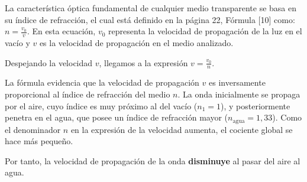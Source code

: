 \documentclass[11pt, a4paper]{article}
\newenvironment{problem}[1][Cuestión]{
	\vspace{0.5cm}
	\noindent{\Large\bfseries #1} \par\vspace{0.5cm}
}{
	\vspace{0.5cm}
}
\begin{document}
\begin{problem}[Cuestión 1]
\begin{enumerate}[label=\alph*)]
			{ \color{blue} 
				La característica óptica fundamental de cualquier medio transparente se basa en su índice de refracción, el cual está definido en la página 22, Fórmula [10] como: $n = \frac{v_0}{v}$. En esta ecuación, $v_0$ representa la velocidad de propagación de la luz en el vacío y $v$ es la velocidad de propagación en el medio analizado.

				Despejando la velocidad $v$, llegamos a la expresión $v = \frac{v_0}{n}$. 

				La fórmula evidencia que la velocidad de propagación $v$ es inversamente proporcional al índice de refracción del medio $n$. La onda inicialmente se propaga por el aire, cuyo índice es muy próximo al del vacío ($n_1 = 1$), y posteriormente penetra en el agua, que posee un índice de refracción mayor ($n_{\text{agua}} = 1,33$). Como el denominador $n$ en la expresión de la velocidad aumenta, el cociente global se hace más pequeño.

				Por tanto, la velocidad de propagación de la onda \textbf{disminuye} al pasar del aire al agua.
			}
		\end{enumerate}
	\end{problem}
\end{document}
